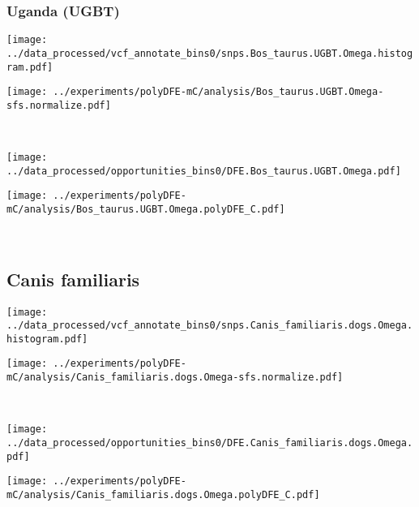 \subsubsection{Uganda (UGBT)}

\begin{minipage}{0.49\linewidth}
    \texttt{[image: ../data\_processed/vcf\_annotate\_bins0/snps.Bos\_taurus.UGBT.Omega.histogram.pdf]}
\end{minipage}
\begin{minipage}{0.49\linewidth}
    \texttt{[image: ../experiments/polyDFE-mC/analysis/Bos\_taurus.UGBT.Omega-sfs.normalize.pdf]}
\end{minipage}
\\
\begin{minipage}{0.49\linewidth}
    \texttt{[image: ../data\_processed/opportunities\_bins0/DFE.Bos\_taurus.UGBT.Omega.pdf]}
\end{minipage}
\begin{minipage}{0.49\linewidth}
    \texttt{[image: ../experiments/polyDFE-mC/analysis/Bos\_taurus.UGBT.Omega.polyDFE\_C.pdf]}
\end{minipage}
\\

\subsection{Canis familiaris}

\begin{minipage}{0.49\linewidth}
    \texttt{[image: ../data\_processed/vcf\_annotate\_bins0/snps.Canis\_familiaris.dogs.Omega.histogram.pdf]}
\end{minipage}
\begin{minipage}{0.49\linewidth}
    \texttt{[image: ../experiments/polyDFE-mC/analysis/Canis\_familiaris.dogs.Omega-sfs.normalize.pdf]}
\end{minipage}
\\
\begin{minipage}{0.49\linewidth}
    \texttt{[image: ../data\_processed/opportunities\_bins0/DFE.Canis\_familiaris.dogs.Omega.pdf]}
\end{minipage}
\begin{minipage}{0.49\linewidth}
    \texttt{[image: ../experiments/polyDFE-mC/analysis/Canis\_familiaris.dogs.Omega.polyDFE\_C.pdf]}
\end{minipage}
\\

